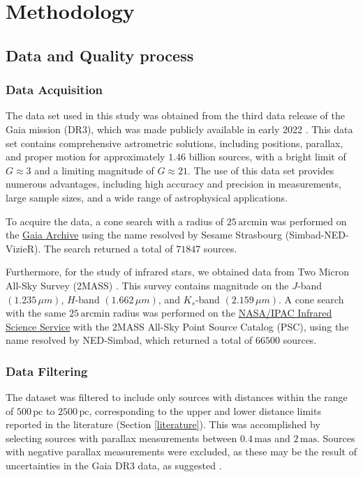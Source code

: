 \documentclass[fleqn,usenatbib,usedcolumn,useAMS]{mnras}
\begin{document}
\section{Methodology}\label{methodology}
\subsection{Data and Quality process}
\subsubsection{Data Acquisition}

The data set used in this study was obtained from the third data release of the Gaia mission (DR3), which was made publicly available in early 2022 \citep{2016A&A...595A...1G,2022arXiv220800211G}. This data set contains comprehensive astrometric solutions, including positions, parallax, and proper motion for approximately $1.46$ billion sources, with a bright limit of $G \approx 3$ and a limiting magnitude of $G \approx 21$. The use of this data set provides numerous advantages, including high accuracy and precision in measurements, large sample sizes, and a wide range of astrophysical applications.

To acquire the data, a cone search with a radius of $25\,\textrm{arcmin}$ was performed on the \href{https://gea.esac.esa.int/archive/}{Gaia Archive} using the name resolved by Sesame Strasbourg (Simbad-NED-VizieR). The search returned a total of $71847$ sources.

Furthermore, for the study of infrared stars,  we obtained data from Two Micron All-Sky Survey (2MASS) \citep{2006AJ....131.1163S}. This survey contains magnitude on the $J$-band $(1.235\,\mu m)$, $H$-band $(1.662\,\mu m)$, and $K_s$-band $(2.159\,\mu m)$. A cone search with the same $25\,\textrm{arcmin}$ radius was performed on the \href{https://irsa.ipac.caltech.edu/Missions/2mass.html}{NASA/IPAC Infrared Science Service} with the 2MASS All-Sky Point Source Catalog (PSC), using the name resolved by NED-Simbad, which returned a total of $66500$ sources.

\subsubsection{Data Filtering}
The dataset was filtered to include only sources with distances within the range of $500\,\textrm{pc}$ to $2500\,\textrm{pc}$, corresponding to the upper and lower distance limits reported in the literature (Section \ref{literature}). This was accomplished by selecting sources with parallax measurements between $0.4\,\textrm{mas}$ and $2\,\textrm{mas}$. Sources with negative parallax measurements were excluded, as these may be the result of uncertainties in the Gaia DR3 data, as suggested \citet{2018A&A...616A...9L}.
\end{document}
